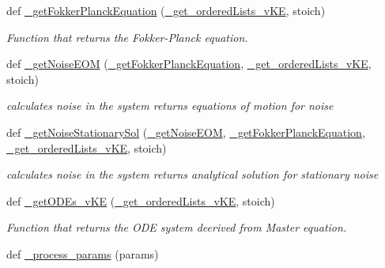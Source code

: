\begin{DoxyCompactItemize}
def \hyperlink{namespace_mu_mo_t_1_1_mu_mo_t_af4a11defe964c17a082b91a97f7f8034}{\+\_\+get\+Fokker\+Planck\+Equation} (\hyperlink{namespace_mu_mo_t_1_1_mu_mo_t_aa4d9e72bb9834df8dc09115a251c1973}{\+\_\+get\+\_\+ordered\+Lists\+\_\+v\+KE}, stoich)
\begin{DoxyCompactList}\small\item\em Function that returns the Fokker-\/\+Planck equation. \end{DoxyCompactList}\item 
def \hyperlink{namespace_mu_mo_t_1_1_mu_mo_t_af8a8a57c2a7c5fc2a4b0a97a8db1fb8d}{\+\_\+get\+Noise\+E\+OM} (\hyperlink{namespace_mu_mo_t_1_1_mu_mo_t_af4a11defe964c17a082b91a97f7f8034}{\+\_\+get\+Fokker\+Planck\+Equation}, \hyperlink{namespace_mu_mo_t_1_1_mu_mo_t_aa4d9e72bb9834df8dc09115a251c1973}{\+\_\+get\+\_\+ordered\+Lists\+\_\+v\+KE}, stoich)
\begin{DoxyCompactList}\small\item\em calculates noise in the system returns equations of motion for noise \end{DoxyCompactList}\item 
def \hyperlink{namespace_mu_mo_t_1_1_mu_mo_t_a7bc4299a5e34403a5053afd4b043a0c3}{\+\_\+get\+Noise\+Stationary\+Sol} (\hyperlink{namespace_mu_mo_t_1_1_mu_mo_t_af8a8a57c2a7c5fc2a4b0a97a8db1fb8d}{\+\_\+get\+Noise\+E\+OM}, \hyperlink{namespace_mu_mo_t_1_1_mu_mo_t_af4a11defe964c17a082b91a97f7f8034}{\+\_\+get\+Fokker\+Planck\+Equation}, \hyperlink{namespace_mu_mo_t_1_1_mu_mo_t_aa4d9e72bb9834df8dc09115a251c1973}{\+\_\+get\+\_\+ordered\+Lists\+\_\+v\+KE}, stoich)
\begin{DoxyCompactList}\small\item\em calculates noise in the system returns analytical solution for stationary noise \end{DoxyCompactList}\item 
def \hyperlink{namespace_mu_mo_t_1_1_mu_mo_t_a3154d6b17ff15c26a8da56b5fe48a1f1}{\+\_\+get\+O\+D\+Es\+\_\+v\+KE} (\hyperlink{namespace_mu_mo_t_1_1_mu_mo_t_aa4d9e72bb9834df8dc09115a251c1973}{\+\_\+get\+\_\+ordered\+Lists\+\_\+v\+KE}, stoich)
\begin{DoxyCompactList}\small\item\em Function that returns the O\+DE system deerived from Master equation. \end{DoxyCompactList}\item 
def \hyperlink{namespace_mu_mo_t_1_1_mu_mo_t_ad63ca24684ec4444e3b570dd2b4425c5}{\+\_\+process\+\_\+params} (params)
\item 

\end{DoxyCompactItemize}
